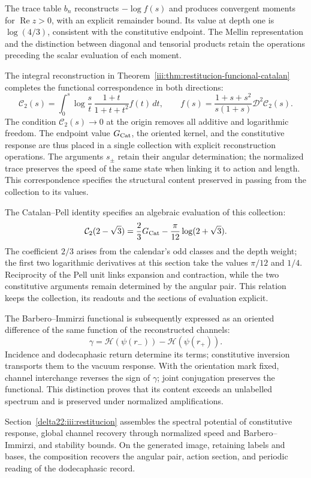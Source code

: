 The trace table $b_n$ reconstructs $-\log f(s)$ and produces convergent
moments for $\operatorname{Re}z>0$, with an explicit remainder bound.
Its value at depth one is $\log(4/3)$, consistent with the constitutive
endpoint. The Mellin representation and the distinction between diagonal
and tensorial products retain the operations preceding the scalar
evaluation of each moment.

The integral reconstruction in
Theorem~\ref{iii:thm:restitucion-funcional-catalan} completes the
functional correspondence in both directions:
\[
 \mathcal C_2(s)=\int_0^s\log\frac{s}{t}\,
       \frac{1+t}{1+t+t^2}f(t)\,dt,\qquad
 f(s)=\frac{1+s+s^2}{s(1+s)}\mathcal D^2\mathcal C_2(s).
\]
The condition $\mathcal C_2(s)\to0$ at the origin removes all
additive and logarithmic freedom. The endpoint value $G_{\rm Cat}$,
the oriented kernel, and the constitutive response are thus placed
in a single collection with explicit reconstruction operations.
The arguments $s_\pm$ retain their angular determination; the
normalized trace preserves the speed of the same state when linking
it to action and length. This correspondence specifies the structural
content preserved in passing from the collection to its values.

The Catalan--Pell identity specifies an algebraic evaluation of this
collection:
\[
\mathcal C_2(2-\sqrt3)
=\frac23G_{\rm Cat}-\frac{\pi}{12}\log(2+\sqrt3).
\]
The coefficient $2/3$ arises from the calendar's odd classes and
the depth weight; the first two logarithmic derivatives at this section take the values
$\pi/12$ and $1/4$. Reciprocity of the Pell unit links expansion
and contraction, while the two constitutive arguments remain
determined by the angular pair. This relation keeps the collection,
its readouts and the sections of evaluation explicit.

The Barbero--Immirzi functional is subsequently expressed as an
oriented difference of the same function of the reconstructed
channels:
\[
\gamma=\mathcal H(\psi(r_-))-\mathcal H(\psi(r_+)).
\]
Incidence and dodecaphasic return determine its terms; constitutive
inversion transports them to the vacuum response. With the
orientation mark fixed, channel interchange reverses the sign of
$\gamma$; joint conjugation preserves the functional. This
distinction proves that its content exceeds an unlabelled spectrum
and is preserved under normalized amplifications.

\par
Section~\ref{delta22:iii:restitucion} assembles the spectral potential of constitutive response, global channel recovery through normalized speed and Barbero--Immirzi, and stability bounds. On the generated image, retaining labels and bases, the composition recovers the angular pair, action section, and periodic reading of the dodecaphasic record.

